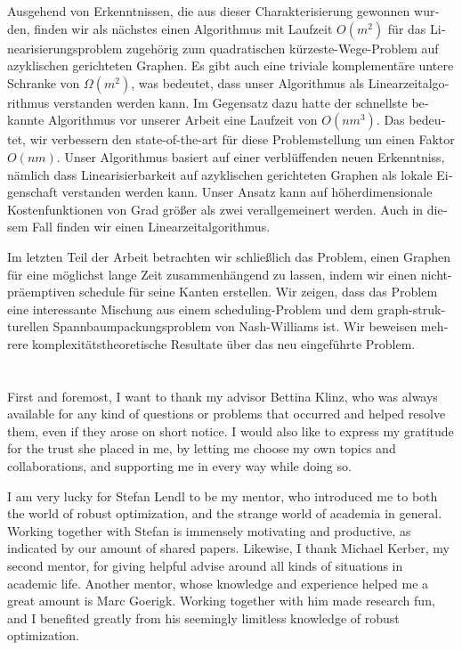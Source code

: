 \documentclass[twoside,openright,bibliography=totoc]{scrreprt}
\begin{document}
\begin{otherlanguage}{ngerman}
Ausgehend von Erkenntnissen, die aus dieser Charakterisierung gewonnen wurden, finden wir als nächstes einen Algorithmus mit Laufzeit $O(m^2)$ für das Linearisierungsproblem zugehörig zum quadratischen kürzeste-Wege-Problem auf azyklischen gerichteten Graphen. 
Es gibt auch eine triviale komplementäre untere Schranke von $\Omega(m^2)$, was bedeutet, dass unser Algorithmus als Linearzeitalgorithmus verstanden werden kann.
Im Gegensatz dazu hatte der schnellste bekannte Algorithmus vor unserer Arbeit eine Laufzeit von $O(nm^3)$. 
Das bedeutet, wir verbessern den state-of-the-art für diese Problemstellung um einen Faktor $O(nm)$. 
Unser Algorithmus basiert auf einer verblüffenden neuen Erkenntniss, nämlich dass Linearisierbarkeit auf azyklischen gerichteten Graphen als lokale Eigenschaft verstanden werden kann.
Unser Ansatz kann auf höherdimensionale Kostenfunktionen von Grad größer als zwei verallgemeinert werden. Auch in diesem Fall finden wir einen Linearzeitalgorithmus.


Im letzten Teil der Arbeit betrachten wir schließlich das Problem, einen Graphen für eine möglichst lange Zeit zusammenhängend zu lassen, indem wir einen nicht-präemptiven schedule für seine Kanten erstellen. Wir zeigen, dass das Problem eine interessante Mischung aus einem scheduling-Problem und dem graph-strukturellen Spannbaumpackungsproblem von Nash-Williams ist. Wir beweisen mehrere komplexitätstheoretische Resultate über das neu eingeführte Problem.


\end{otherlanguage}




\cleardoublepage

\chapter*{}

First and foremost, I want to thank my advisor Bettina Klinz, who was always available for any kind of questions or problems that occurred and helped resolve them, even if they arose on short notice. I would also like to express my gratitude for the trust she placed in me, by letting me choose my own topics and collaborations, and supporting me in every way while doing so.

I am very lucky for Stefan Lendl to be my mentor, who introduced me to both the world of robust optimization, and the strange world of academia in general. Working together with Stefan is immensely motivating and productive, as indicated by our amount of shared papers. 
Likewise, I thank Michael Kerber, my second mentor, for giving helpful advise around all kinds of situations in academic life. 
Another mentor, whose knowledge and experience helped me a great amount is Marc Goerigk. Working together with him made research fun, and I benefited greatly from his seemingly limitless knowledge of robust optimization.
\end{document}
